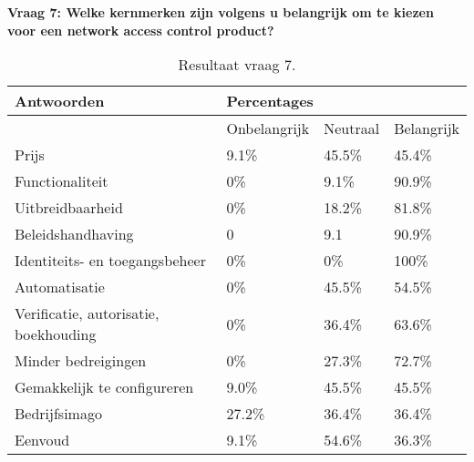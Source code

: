 \textbf{Vraag 7: Welke kernmerken zijn volgens u belangrijk om te kiezen voor een network access control product?}
\begin{table}[h!]
	\begin{center}
		\begin{tabular}{|l|l|l|l|}
			\hline
			\bf Antwoorden          & \multicolumn{3}{l|}{\bf Percentages} \\ \hline
					 			  				  & Onbelangrijk & Neutraal & Belangrijk \\ \hline
			Prijs                                 & 9.1\%        & 45.5\%   & 45.4\%     \\ \hline
			Functionaliteit                       & 0\%          & 9.1\%    & 90.9\%     \\ \hline
			Uitbreidbaarheid                      & 0\%          & 18.2\%   & 81.8\%     \\ \hline
			Beleidshandhaving                     & 0            & 9.1      & 90.9\%     \\ \hline
			Identiteits- en toegangsbeheer        & 0\%          & 0\%      & 100\%      \\ \hline
			Automatisatie                         & 0\%          & 45.5\%   & 54.5\%     \\ \hline
			Verificatie, autorisatie, boekhouding & 0\%          & 36.4\%   & 63.6\%     \\ \hline
			Minder bedreigingen                   & 0\%          & 27.3\%   & 72.7\%     \\ \hline
			Gemakkelijk te configureren           & 9.0\%        & 45.5\%   & 45.5\%     \\ \hline
			Bedrijfsimago                         & 27.2\%       & 36.4\%   & 36.4\%     \\ \hline
			Eenvoud                               & 9.1\%        & 54.6\%   & 36.3\%     \\ \hline
		\end{tabular}
		\caption{Resultaat vraag 7.}
	\end{center}
\end{table}


